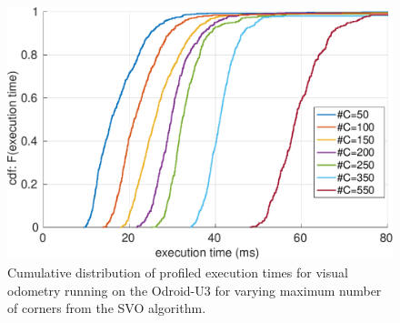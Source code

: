 \begin{figure}[htbp]
  \centering
  \includegraphics[width=0.9\columnwidth]{figures/time_ecdf_millisec.pdf}
  \caption{Cumulative distribution of profiled execution times for visual odometry running on the Odroid-U3 for varying maximum number of corners from the SVO algorithm.}
  \label{fig:time_ecdf}
\end{figure}






